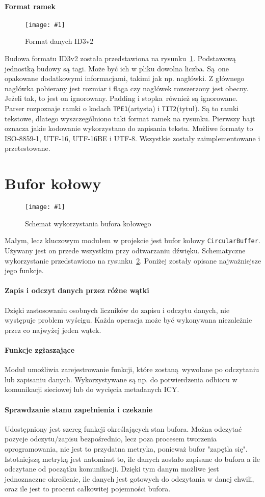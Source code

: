 \documentclass[polish]{aghengthesis}
\newcommand{\imgint}[4]{
	\begin{figure}[{#4}]
		\centering
		\texttt{[image: \#1]}
		\caption{#2}
		\label{#1}
	\end{figure}
}
\newcommand{\imgcs}[3]{\imgint{#1}{#2}{#3}{}}
\begin{document}
			\paragraph{Format ramek}
			\imgcs{3/PicoRadio-id3}{Format danych ID3v2}{0.8}
			Budowa formatu ID3v2 została przedstawiona na rysunku~\ref{3/PicoRadio-id3}. Podstawową jednostką budowy są tagi. Może być ich w pliku dowolna liczba. Są one opakowane dodatkowymi informacjami, takimi jak np. nagłówki. Z głównego nagłówka pobierany jest rozmiar i flaga czy nagłówek rozszerzony jest obecny. Jeżeli tak, to jest on ignorowany. Padding i stopka również są ignorowane.
			$ $\\
			
			Parser rozpoznaje ramki o kodach \lstinline|TPE1|(artysta) i \lstinline|TIT2|(tytuł). Są to ramki tekstowe, dlatego wyszczególniono taki format ramek na rysunku. Pierwszy bajt oznacza jakie kodowanie wykorzystano do zapisania tekstu. Możliwe formaty to ISO-8859-1, UTF-16, UTF-16BE i UTF-8. Wszystkie zostały zaimplementowane i przetestowane.
	
	\section{Bufor kołowy}
		\label{sec:circular_buffer}
		\imgcs{3/PicoRadio-buffer}{Schemat wykorzystania bufora kołowego}{0.8}
		Małym, lecz kluczowym modułem w projekcie jest bufor kołowy \lstinline|CircularBuffer|. Używany jest on przede wszystkim przy odtwarzaniu dźwięku. Schematyczne wykorzystanie przedstawiono na rysunku~\ref{3/PicoRadio-buffer}. Poniżej zostały opisane najważniejsze jego funkcje.
		
		\paragraph{Zapis i odczyt danych przez różne wątki}
			Dzięki zastosowaniu osobnych liczników do zapisu i odczytu danych, nie występuje problem wyścigu. Każda operacja może być wykonywana niezależnie przez co najwyżej jeden wątek.
			
		\paragraph{Funkcje zgłaszające}
			Moduł umożliwia zarejestrowanie funkcji, które zostaną wywołane po odczytaniu lub zapisaniu danych. Wykorzystywane są np. do potwierdzenia odbioru w komunikacji sieciowej lub do wycięcia metadanych ICY.
		
		\paragraph{Sprawdzanie stanu zapełnienia i czekanie}
			Udostępniony jest szereg funkcji określających stan bufora. Można odczytać pozycje odczytu/zapisu bezpośrednio, lecz poza procesem tworzenia oprogramowania, nie jest to przydatna metryka, ponieważ bufor "zapętla się". Istotniejszą metryką jest natomiast to, ile danych zostało zapisane do bufora a ile odczytane od początku komunikacji. Dzięki tym danym możliwe jest jednoznaczne określenie, ile danych jest gotowych do odczytania w danej chwili, oraz ile jest to procent całkowitej pojemności bufora.
		
\end{document}
